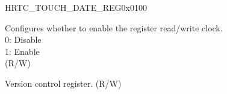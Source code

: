 \begin{register}{H}{RTC\_TOUCH\_DATE\_REG}{0x0100}\label{regdesc:RTCTOUCHDATEREG}
%
%
%
\regnewline%
\begin{regdesc}\begin{reglist}
\label{fielddesc:RTCCLKEN}\item [RTC\_CLK\_EN] Configures whether to enable the register read/write clock.\\
0: Disable \\
1: Enable\\
(R/W)
\label{fielddesc:RTCDATE}\item [RTC\_DATE] Version control register. (R/W)
\end{reglist}\end{regdesc}
\end{register}
